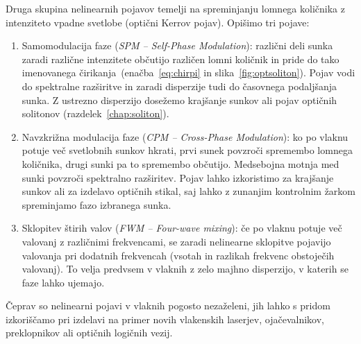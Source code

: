 Druga skupina nelinearnih pojavov temelji na spreminjanju 
lomnega količnika z intenziteto vpadne svetlobe (optični Kerrov pojav).
Opišimo tri pojave:
\begin{enumerate}
\item 
Samomodulacija faze ({\it SPM -- Self-Phase Modulation}): različni deli
sunka zaradi različne intenzitete občutijo različen lomni količnik in pride
do tako imenovanega čirikanja~(enačba~\ref{eq:chirpi} 
in slika~\ref{fig:optsoliton}). 
Pojav vodi do spektralne razširitve in zaradi
disperzije tudi do časovnega podaljšanja sunka. Z ustrezno disperzijo dosežemo 
krajšanje sunkov ali pojav optičnih solitonov (razdelek~\ref{chap:soliton}).

\item
Navzkrižna modulacija faze ({\it CPM -- Cross-Phase Modulation}): ko po vlaknu
potuje več svetlobnih sunkov hkrati, prvi sunek povzroči spremembo lomnega količnika, 
drugi sunki pa to spremembo občutijo. Medsebojna motnja med sunki povzroči 
spektralno razširitev. Pojav lahko izkoristimo za krajšanje sunkov ali
za izdelavo optičnih stikal, 
saj lahko z zunanjim kontrolnim žarkom spreminjamo fazo izbranega sunka.

\item
Sklopitev štirih valov ({\it FWM -- Four-wave mixing}): če po vlaknu potuje več
valovanj z različnimi frekvencami, 
se zaradi nelinearne sklopitve pojavijo
valovanja pri dodatnih frekvencah (vsotah in razlikah frekvenc obstoječih valovanj). To velja
predvsem v vlaknih z zelo majhno disperzijo, v katerih se faze lahko ujemajo.
\end{enumerate}

Čeprav so nelinearni pojavi v vlaknih pogosto nezaželeni, jih lahko s pridom
izkoriščamo pri izdelavi na primer novih vlakenskih laserjev, ojačevalnikov, preklopnikov ali 
optičnih logičnih vezij. 
